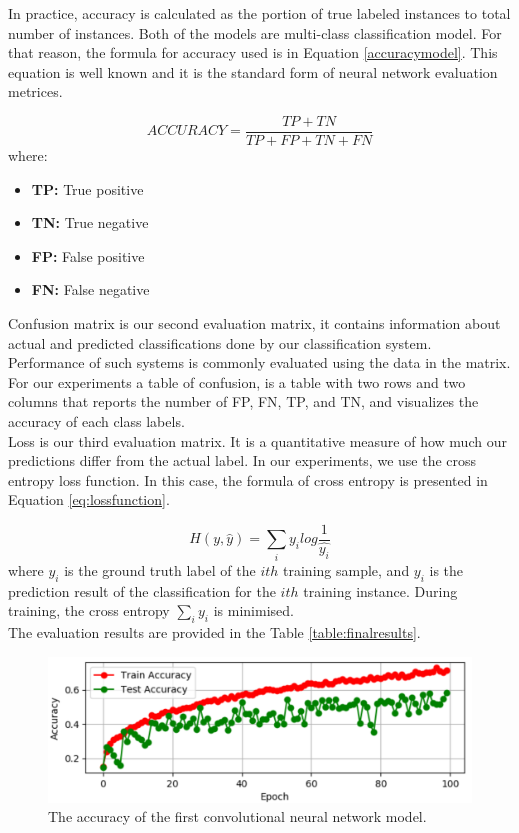In practice, accuracy is calculated as the portion of true labeled instances to total number of instances. Both of the models are multi-class classification model. For that reason, the formula for accuracy used is in Equation \ref{accuracymodel}. This equation is well known and it is the standard form of neural network evaluation metrices.

\begin{equation}\label{accuracymodel}
     ACCURACY=\frac{TP+TN}{TP+FP+TN+FN}
\end{equation}
where:\\
\begin{itemize}
    \item \textbf{TP:} True positive
    \item \textbf{TN:} True negative
    \item \textbf{FP:} False positive
    \item \textbf{FN:} False negative
\end{itemize}

Confusion matrix is our second evaluation matrix, it contains information about actual and predicted classifications done by our classification system. Performance of such systems is
commonly evaluated using the data in the matrix. For our experiments a table of confusion, is a table with two rows and two columns that reports the number of FP, FN, TP, and TN, and visualizes the accuracy of each class labels.\\

Loss is our third evaluation matrix. It is a quantitative measure of how much our predictions differ from the actual label. In our experiments, we use the cross entropy loss function. In this case, the formula of cross entropy is presented in Equation \ref{eq:lossfunction}.

\begin{equation}\label{eq:lossfunction}
    H(y,\widehat{y})=\sum _{i}y_{i}log\frac{1}{\widehat{y_{i}}}
\end{equation}
where $\widehat{y_{i}}$ is the ground truth label of the $ith$ training sample, and $y_{i}$ is the prediction result of the classification for the $ith$ training instance. During training, the cross entropy $\sum _{i}y_{i}$ is minimised.\\

The evaluation results are provided in the Table \ref{table:finalresults}.
\begin{figure}[ht]
\centering
\includegraphics[width=1.0\columnwidth]{Figures/accuracycnnmodel}
\decoRule
\caption[The accuracy of the first convolutional neural network model.]{The accuracy of the first convolutional neural network model.}
\label{fig:cnnaccuracy12}
\end{figure}

